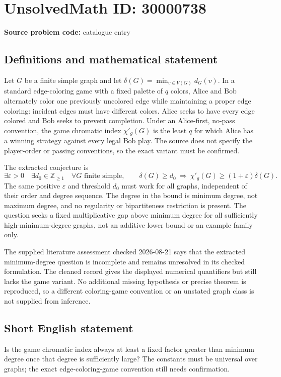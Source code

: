 \documentclass[11pt]{article}
\newcommand{\Z}{\mathbb{Z}}
\begin{document}
\section*{UnsolvedMath ID: 30000738}
\textbf{Source problem code:} catalogue entry
\subsection{Definitions and mathematical statement}
Let \(G\) be a finite simple graph and let \(\delta(G)=\min_{v\in V(G)}d_G(v)\). In a standard edge-coloring game with a fixed palette of \(q\) colors, Alice and Bob alternately color one previously uncolored edge while maintaining a proper edge coloring: incident edges must have different colors. Alice seeks to have every edge colored and Bob seeks to prevent completion. Under an Alice-first, no-pass convention, the game chromatic index \(\chi'_g(G)\) is the least \(q\) for which Alice has a winning strategy against every legal Bob play. The source does not specify the player-order or passing conventions, so the exact variant must be confirmed.

The extracted conjecture is
\[
\exists\varepsilon>0\quad\exists d_0\in\Z_{\geq1}\quad
\forall G\text{ finite simple},\qquad
\delta(G)\geq d_0\ \Longrightarrow\ 
\chi'_g(G)\geq(1+\varepsilon)\delta(G).
\]
The same positive \(\varepsilon\) and threshold \(d_0\) must work for all graphs, independent of their order and degree sequence. The degree in the bound is minimum degree, not maximum degree, and no regularity or bipartiteness restriction is present. The question seeks a fixed multiplicative gap above minimum degree for all sufficiently high-minimum-degree graphs, not an additive lower bound or an example family only.

The supplied literature assessment checked 2026-08-21 says that the extracted minimum-degree question is incomplete and remains unresolved in its checked formulation. The cleaned record gives the displayed numerical quantifiers but still lacks the game variant. No additional missing hypothesis or precise theorem is reproduced, so a different coloring-game convention or an unstated graph class is not supplied from inference.
\subsection{Short English statement}
Is the game chromatic index always at least a fixed factor greater than minimum degree once that degree is sufficiently large? The constants must be universal over graphs; the exact edge-coloring-game convention still needs confirmation.
\end{document}

